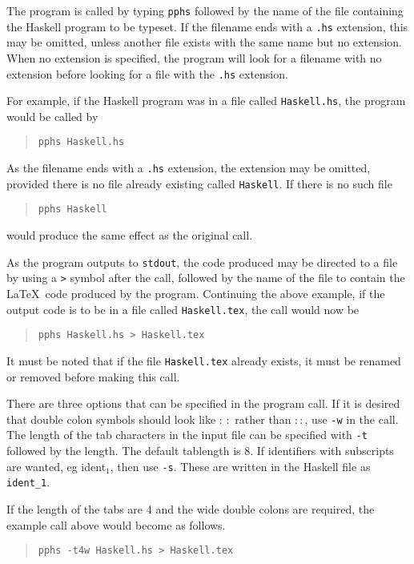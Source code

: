 
The program is called by typing {\tt pphs} followed by the name of
the file containing the Haskell program to be typeset.  If the
filename ends with a {\tt .hs} extension, this may be omitted,
unless another file exists with the same name but no extension.
When no extension is specified, the program will look for a
filename with no extension before looking for a file with the
{\tt .hs} extension.

For example, if the Haskell program was in a file called {\tt Haskell.hs},
the program would be called by
\begin{quote}
\tt pphs Haskell.hs
\end{quote}
As the filename ends with a {\tt .hs} extension, the extension may be omitted, provided
there is no file already existing called {\tt Haskell}.  If there is no such file
\begin{quote}
\tt pphs Haskell
\end{quote}
would produce the same effect as the original call.

As the program outputs to {\tt stdout}, the code produced may be
directed to a file by using a {\tt >} symbol after the call, followed by
the name of the file to contain the \LaTeX\ code produced by the
program.  Continuing the above example, if the output code is to be in
a file called {\tt Haskell.tex}, the call would now be
\begin{quote}
\tt pphs Haskell.hs > Haskell.tex
\end{quote}
It must be noted that if the file {\tt Haskell.tex} already exists, it must be
renamed or removed before making this call.

There are three options that can be specified in the program call.
If it is desired that double colon symbols should look like $:\,:$ rather than $::$,
use {\tt -w} in the call.  The length of the tab characters in the input file can
be specified with {\tt -t} followed by the length.  The default tablength is 8.
If identifiers with subscripts are wanted, eg {\iden ident$_1$\/}, then use {\tt -s}.
These are written in the Haskell file as {\tt ident\_1}.

If the length of the tabs are 4 and
the wide double colons are required, the example call above would become as follows.
\begin{quote}
\tt pphs -t4w Haskell.hs > Haskell.tex
\end{quote}


